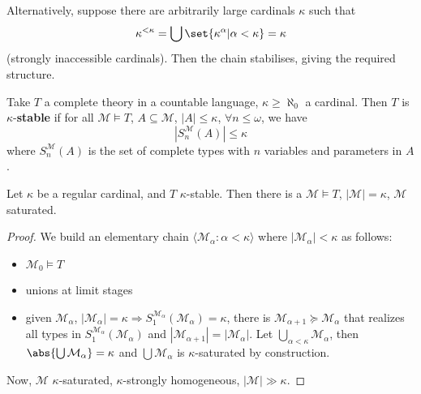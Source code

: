 \documentclass{article}
\makeatletter
\let\models\vDash
\newcommand{\bonusnamed}[1]{\textbf{#1}\index{#1@*#1}}
\newcommand{\M}{\mathcal{M}}
\makeatother
\begin{document}
Alternatively, suppose there are arbitrarily large cardinals $\kappa$ such that
\begin{align*}
  \kappa^{< \kappa} = \bigcup \set{\kappa^\alpha | \alpha < \kappa} = \kappa
\end{align*}
(strongly inaccessible cardinals).
Then the chain stabilises, giving the required structure. %
\begin{defi}
  Take $T$ a complete theory in a countable language, $\kappa \geq \aleph_0$ a cardinal.
  Then $T$ is $\kappa$-\bonusnamed{stable} if for all $\mathcal{M} \models T$, $A \subseteq \mathcal{M}$, $|A| \leq \kappa$, $\forall n \leq \omega$,
  we have
  \begin{equation*}
    |S_n^\mathcal{M}(A)| \leq \kappa
  \end{equation*}
  where $S_n^\mathcal{M}(A)$ is the set of complete types with $n$ variables and parameters in $A$.
\end{defi}
\begin{thm}
  Let $\kappa$ be a regular cardinal, and $T$ $\kappa$-stable. Then there is a $\mathcal{M} \models T$, $|\mathcal{M}| = \kappa$, $\M$ saturated.
\end{thm}
\begin{proof}
  We build an elementary chain $\langle \M_\alpha : \alpha < \kappa \rangle$ where $|\M_\alpha| < \kappa$ as follows:
  \begin{itemize}
    \item $\M_0 \models T$
    \item unions at limit stages
    \item given $\M_\alpha$, $|\M_\alpha|=\kappa \Rightarrow S^{\M_\alpha}_1(\M_\alpha) = \kappa$,
      there is $\M_{\alpha+1} \succcurlyeq \M_\alpha$ that realizes all types in $S_1^{\M_\alpha}(\M_\alpha)$ and $|\M_{\alpha+1}| = |\M_\alpha|$.
      Let $\bigcup_{\alpha < \kappa} \M_\alpha$, then $\abs{\bigcup \M_\alpha} = \kappa$ and $\bigcup \M_\alpha$ is $\kappa$-saturated by construction.
  \end{itemize}
  Now, $\mathcal{M}$ $\kappa$-saturated, $\kappa$-strongly homogeneous, $|\M| \gg \kappa$.
\end{proof}
\printindex
\end{document}
